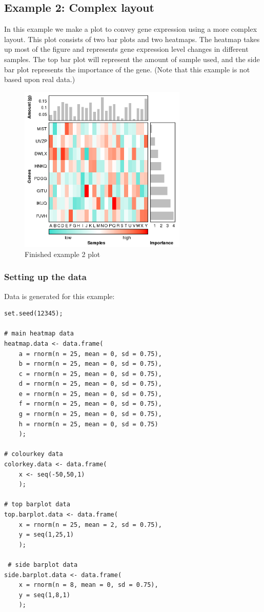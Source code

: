 \documentclass[letterpaper]{article}
\begin{document}
\subsection{Example 2: Complex layout}

In this example we make a plot to convey gene expression using a more complex layout. This plot consists of two bar plots and two heatmaps. The heatmap takes up most of the figure and represents gene expression level changes in different samples. The top bar plot will represent the amount of sample used, and the side bar plot represents the importance of the gene. (Note that this example is not based upon real data.)

\begin{figure}[!ht]
  \begin{center}
     \includegraphics[width=80mm]{Figures/Multiplot_Ex2.png}
     \caption{Finished example 2 plot}
     \label{fig:picture}
  \end{center}
\end{figure}

\subsubsection{Setting up the data}

Data is generated for this example: 

\begin{verbatim}
set.seed(12345);

# main heatmap data
heatmap.data <- data.frame(
    a = rnorm(n = 25, mean = 0, sd = 0.75),
    b = rnorm(n = 25, mean = 0, sd = 0.75),
    c = rnorm(n = 25, mean = 0, sd = 0.75),
    d = rnorm(n = 25, mean = 0, sd = 0.75),
    e = rnorm(n = 25, mean = 0, sd = 0.75),
    f = rnorm(n = 25, mean = 0, sd = 0.75),
    g = rnorm(n = 25, mean = 0, sd = 0.75),
    h = rnorm(n = 25, mean = 0, sd = 0.75)
    );

# colourkey data
colorkey.data <- data.frame(
    x <- seq(-50,50,1)
    );

# top barplot data
top.barplot.data <- data.frame(
    x = rnorm(n = 25, mean = 2, sd = 0.75),
    y = seq(1,25,1)
    );
 
 # side barplot data
side.barplot.data <- data.frame(
    x = rnorm(n = 8, mean = 0, sd = 0.75),
    y = seq(1,8,1)
    );
\end{verbatim}
\end{document}
